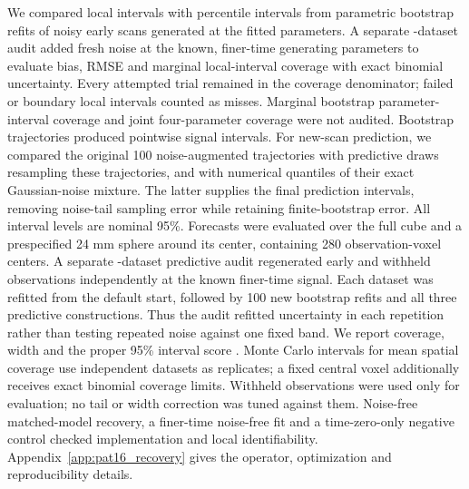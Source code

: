 We compared local intervals with percentile intervals from \PRBootstraps{} parametric bootstrap refits of noisy early scans generated at the fitted parameters. A separate \PRTrials{}-dataset audit added fresh noise at the known, finer-time generating parameters to evaluate bias, RMSE and marginal local-interval coverage with exact binomial uncertainty. Every attempted trial remained in the coverage denominator; failed or boundary local intervals counted as misses. Marginal bootstrap parameter-interval coverage and joint four-parameter coverage were not audited. Bootstrap trajectories produced pointwise signal intervals. For new-scan prediction, we compared the original 100 noise-augmented trajectories with \PPDraws{} predictive draws resampling these trajectories, and with numerical quantiles of their exact Gaussian-noise mixture. The latter supplies the final prediction intervals, removing noise-tail sampling error while retaining finite-bootstrap error. All interval levels are nominal 95\%. Forecasts were evaluated over the full cube and a prespecified 24 mm sphere around its center, containing 280 observation-voxel centers. A separate \PPTrials{}-dataset predictive audit regenerated early and withheld observations independently at the known finer-time signal. Each dataset was refitted from the default start, followed by 100 new bootstrap refits and all three predictive constructions. Thus the audit refitted uncertainty in each repetition rather than testing repeated noise against one fixed band. We report coverage, width and the proper 95\% interval score \citep{gneiting2007}. Monte Carlo intervals for mean spatial coverage use independent datasets as replicates; a fixed central voxel additionally receives exact binomial coverage limits. Withheld observations were used only for evaluation; no tail or width correction was tuned against them. Noise-free matched-model recovery, a finer-time noise-free fit and a time-zero-only negative control checked implementation and local identifiability. Appendix~\ref{app:pat16_recovery} gives the operator, optimization and reproducibility details.
